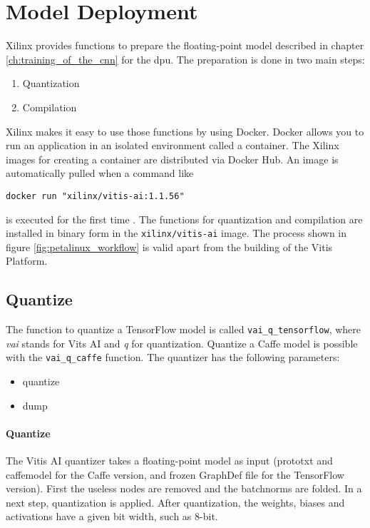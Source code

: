 \section{Model Deployment}
\label{sec:embedded_platform:model_deployment}

Xilinx provides functions to prepare the floating-point model described in chapter \ref{ch:training_of_the_cnn} for the \acrshort{dpu}.
The preparation is done in two main steps:
\begin{enumerate}
  \item Quantization
  \item Compilation
\end{enumerate}
Xilinx makes it easy to use those functions by using Docker.
Docker allows you to run an application in an isolated environment called a container.
The Xilinx images for creating a container are distributed via Docker Hub.
An image is automatically pulled when a command like
\begin{lstlisting}[style=bash, caption={}, label=lst:pull_img]
  docker run "xilinx/vitis-ai:1.1.56"
\end{lstlisting}
is executed for the first time \cite{docker_overview}.
The functions for quantization and compilation are installed in binary form in the \texttt{xilinx/vitis-ai} image.
The process shown in figure \ref{fig:petalinux_workflow} is valid apart from the building of the Vitis Platform.

\subsection{Quantize}
\label{subsec:embedded_platform:model_deployment:quantize}

The function to quantize a TensorFlow model is called \texttt{vai\_q\_tensorflow}, where \textit{vai} stands for Vits AI and \textit{q} for quantization.
Quantize a Caffe model is possible with the \texttt{vai\_q\_caffe} function.
The quantizer has the following parameters:
\begin{itemize}
  \item quantize
  \item dump
\end{itemize}

\paragraph{Quantize}
The Vitis AI quantizer takes a floating-point model as input (prototxt and caffemodel for the Caffe version, and frozen GraphDef file for the TensorFlow version).
First the useless nodes are removed and the batchnorms are folded.
In a next step, quantization is applied.
After quantization, the weights, biases and activations have a given bit width, such as 8-bit.


